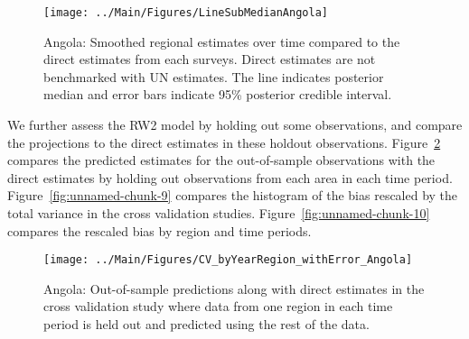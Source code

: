 \documentclass[12pt]{article}\usepackage[]{graphicx}\usepackage[]{color}
\newenvironment{knitrout}{}{} %
\begin{document}
\begin{knitrout}
\color{fgcolor}\begin{figure}[bht]

{\centering \texttt{[image: ../Main/Figures/LineSubMedianAngola]} 

}

\caption[Angola]{Angola: Smoothed regional estimates over time compared to the direct estimates from each surveys. Direct estimates are not benchmarked with UN estimates. The line indicates posterior median and error bars indicate 95\% posterior credible interval.}\label{fig:unnamed-chunk-7}
\end{figure}


\end{knitrout}
We further assess the RW2 model by holding out some observations, and compare the projections to the direct estimates in these holdout observations. Figure~\ref{fig:unnamed-chunk-8} compares the predicted estimates for the out-of-sample observations  with the direct estimates by holding out observations from each area in each time period.  Figure~\ref{fig:unnamed-chunk-9} compares the histogram of the bias rescaled by the total variance in the cross validation studies. Figure~\ref{fig:unnamed-chunk-10} compares the rescaled bias by region and time periods.



 
\begin{knitrout}
\color{fgcolor}\begin{figure}[bht]

{\centering \texttt{[image: ../Main/Figures/CV\_byYearRegion\_withError\_Angola]} 

}

\caption[Angola]{Angola: Out-of-sample predictions along with direct estimates in the cross validation study where data from one region in each time period is held out and predicted using the rest of the data.}\label{fig:unnamed-chunk-8}
\end{figure}


\end{knitrout}
\end{document}
